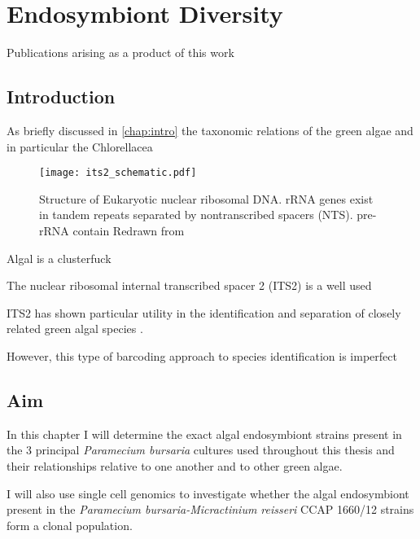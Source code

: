 % 
\graphicspath{{chapters/3.Chapter_1/figures}}

\chapter{Endosymbiont Diversity}\label{chap:endo_diversity}

Publications arising as a product of this work \citep{Chambouvet2015} 

\section{Introduction}

As briefly discussed in \ref{chap:intro} the taxonomic relations
of the green algae and in particular the Chlorellacea 



\begin{figure}[h]
    \texttt{[image: its2\_schematic.pdf]}
    \caption{Structure of Eukaryotic nuclear ribosomal DNA.
        rRNA genes exist in tandem repeats separated by nontranscribed spacers (NTS).
        pre-rRNA contain 
    Redrawn from \citep{}}
    \label{fig;its2_schematic]}
\end{figure}



Algal is a clusterfuck





The nuclear ribosomal internal transcribed spacer 2 (ITS2) is a well used


ITS2 has shown particular utility in the identification and separation
of closely related green algal species \citep{Buchheim2011}.


However, this type of barcoding approach to species identification is 
imperfect 


\section{Aim}

In this chapter I will determine the exact algal endosymbiont strains present
in the 3 principal \textit{Paramecium bursaria} cultures used throughout
this thesis and their relationships relative to one another and to
other green algae.

I will also use single cell genomics to investigate whether the algal
endosymbiont present in the \textit{Paramecium bursaria-Micractinium reisseri}
CCAP 1660/12 strains form a clonal population. 

